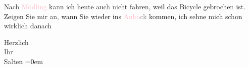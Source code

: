                Nach \textcolor{pink}{Mödling}{}\ledrightnote{\textcolor{pink}{Mödling}} kann ich heute auch nicht {\pb}fahren, weil das Bicycle gebrochen ist. Zeigen Sie mir an, wann Sie wieder ins \textcolor{pink}{Aubö\textcolor{gray}{ck}}{}\ledrightnote{\textcolor{pink}{Café Reichsrath (Inh. Karl Auböck)}} kommen, ich sehne mich schon wirklich danach\pend
           
\pstart
           Herzlich {\\[\baselineskip]}Ihr {\\[\baselineskip]}\spacefill\mbox{Salten}\pend
           \leftskip=0em{}\endnumbering{}  
      